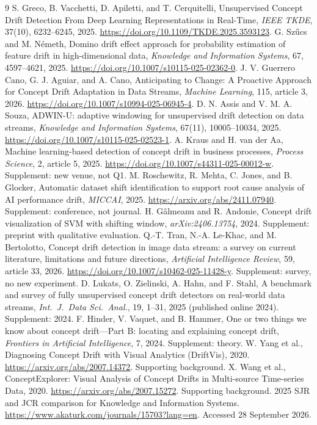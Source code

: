 \documentclass[10pt,a4paper]{article}
\begin{document}
\begin{thebibliography}{9}\small
{} S. Greco, B. Vacchetti, D. Apiletti, and T. Cerquitelli, Unsupervised Concept Drift Detection From Deep Learning Representations in Real-Time, \emph{IEEE TKDE}, 37(10), 6232--6245, 2025. \url{https://doi.org/10.1109/TKDE.2025.3593123}.
 G. Sz\H{u}cs and M. N\'emeth, Domino drift effect approach for probability estimation of feature drift in high-dimensional data, \emph{Knowledge and Information Systems}, 67, 4597--4621, 2025. \url{https://doi.org/10.1007/s10115-025-02362-0}.
 J. V. Guerrero Cano, G. J. Aguiar, and A. Cano, Anticipating to Change: A Proactive Approach for Concept Drift Adaptation in Data Streams, \emph{Machine Learning}, 115, article 3, 2026. \url{https://doi.org/10.1007/s10994-025-06945-4}.
 D. N. Assis and V. M. A. Souza, ADWIN-U: adaptive windowing for unsupervised drift detection on data streams, \emph{Knowledge and Information Systems}, 67(11), 10005--10034, 2025. \url{https://doi.org/10.1007/s10115-025-02523-1}.
 A. Kraus and H. van der Aa, Machine learning-based detection of concept drift in business processes, \emph{Process Science}, 2, article 5, 2025. \url{https://doi.org/10.1007/s44311-025-00012-w}. Supplement: new venue, not Q1.
 M. Roschewitz, R. Mehta, C. Jones, and B. Glocker, Automatic dataset shift identification to support root cause analysis of AI performance drift, \emph{MICCAI}, 2025. \url{https://arxiv.org/abs/2411.07940}. Supplement: conference, not journal.
 H. G\^almeanu and R. Andonie, Concept drift visualization of SVM with shifting window, \emph{arXiv:2406.13754}, 2024. Supplement: preprint with qualitative evaluation.
 Q.-T. Tran, N.-A. Le-Khac, and M. Bertolotto, Concept drift detection in image data stream: a survey on current literature, limitations and future directions, \emph{Artificial Intelligence Review}, 59, article 33, 2026. \url{https://doi.org/10.1007/s10462-025-11428-y}. Supplement: survey, no new experiment.
 D. Lukats, O. Zielinski, A. Hahn, and F. Stahl, A benchmark and survey of fully unsupervised concept drift detectors on real-world data streams, \emph{Int.\ J.\ Data Sci.\ Anal.}, 19, 1--31, 2025 (published online 2024). Supplement: 2024.
 F. Hinder, V. Vaquet, and B. Hammer, One or two things we know about concept drift---Part B: locating and explaining concept drift, \emph{Frontiers in Artificial Intelligence}, 7, 2024. Supplement: theory.
 W. Yang et al., Diagnosing Concept Drift with Visual Analytics (DriftVis), 2020. \url{https://arxiv.org/abs/2007.14372}. Supporting background.
 X. Wang et al., ConceptExplorer: Visual Analysis of Concept Drifts in Multi-source Time-series Data, 2020. \url{https://arxiv.org/abs/2007.15272}. Supporting background.
 2025 SJR and JCR comparison for Knowledge and Information Systems. \url{https://www.akaturk.com/journals/15703?lang=en}. Accessed 28 September 2026.
\end{thebibliography}
\end{document}
